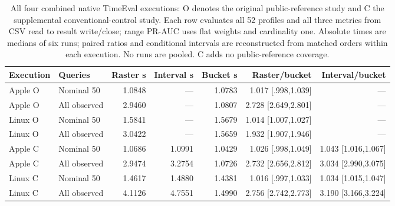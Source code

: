 \begin{table}[t]\centering\small
\begin{tabular}{llrrrrr}\toprule
Execution & Queries & Raster s & Interval s & Bucket s & Raster/bucket & Interval/bucket\\\midrule
Apple O & Nominal 50 & 1.0848 & --- & 1.0783 & 1.017 [.998,1.039] & ---\\
Apple O & All observed & 2.9460 & --- & 1.0807 & 2.728 [2.649,2.801] & ---\\
Linux O & Nominal 50 & 1.5841 & --- & 1.5679 & 1.014 [1.007,1.027] & ---\\
Linux O & All observed & 3.0422 & --- & 1.5659 & 1.932 [1.907,1.946] & ---\\
Apple C & Nominal 50 & 1.0686 & 1.0991 & 1.0429 & 1.026 [.998,1.049] & 1.043 [1.016,1.067]\\
Apple C & All observed & 2.9474 & 3.2754 & 1.0726 & 2.732 [2.656,2.812] & 3.034 [2.990,3.075]\\
Linux C & Nominal 50 & 1.4617 & 1.4880 & 1.4381 & 1.016 [.997,1.033] & 1.034 [1.015,1.047]\\
Linux C & All observed & 4.1126 & 4.7551 & 1.4990 & 2.756 [2.742,2.773] & 3.190 [3.166,3.224]\\
\bottomrule\end{tabular}
\caption{All four combined native TimeEval executions: O denotes the original
public-reference study and C the supplemental conventional-control study.
Each row evaluates all 52 profiles and all three metrics from CSV read to
result write/close; range PR-AUC uses flat weights and cardinality one.
Absolute times are medians of six runs; paired ratios and conditional intervals
are reconstructed from matched orders within each execution. No runs are
pooled. C adds no public-reference coverage.}\label{tab:native-control}
\end{table}

